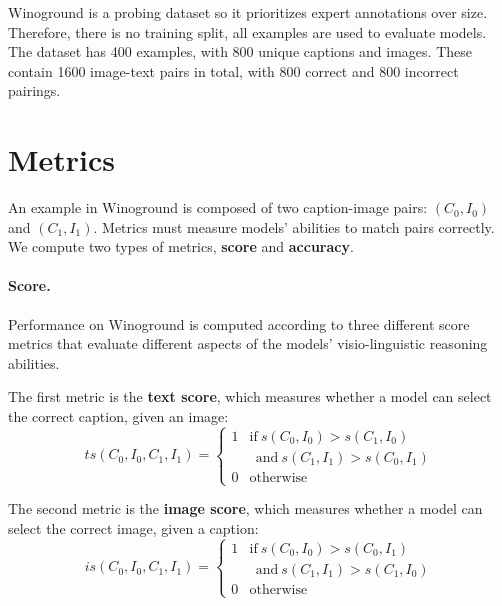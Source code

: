 Winoground is a probing dataset so it prioritizes expert annotations over size. Therefore, there is no training split, all examples are used to evaluate models. The dataset has 400 examples, with 800 unique captions and images. These contain 1600 image-text pairs in total,
with 800 correct and 800 incorrect pairings.

\section{Metrics} \label{sec:winoground_metrics}

An example in Winoground is composed of two caption-image pairs: $(C_{0},I_{0})$ and $(C_{1},I_{1})$. Metrics must measure models' abilities to match pairs correctly. We compute two types of metrics, \textbf{score} and \textbf{accuracy}.

\paragraph{Score.}
Performance on Winoground \cite{thrush2022winoground} is computed according to three different score metrics that evaluate different aspects of the models' visio-linguistic reasoning abilities.

The first metric is the \textbf{text score}, which measures whether a model can select the correct caption, given an image:
\begin{equation}\label{eq:text-score}
        ts(C_{0},I_{0},C_{1},I_{1})= 
    \begin{cases}
        1 & \text{if}\  s(C_{0}, I_{0}) > s(C_{1}, I_{0}) \\
        & \ \ \text{and}\ s(C_{1}, I_{1}) > s(C_{0}, I_{1}) \\
        0              & \text{otherwise}
    \end{cases}
\end{equation}

The second metric is the \textbf{image score}, which measures whether a model can select the correct image, given a caption:
\begin{equation}\label{eq:image-score}
        is(C_{0},I_{0},C_{1},I_{1})= 
    \begin{cases}
        1 & \text{if}\  s(C_{0}, I_{0}) > s(C_{0}, I_{1})\\
        & \ \ \text{and}\ s(C_{1}, I_{1}) > s(C_{1}, I_{0}) \\
        0              & \text{otherwise}
    \end{cases}
\end{equation}

